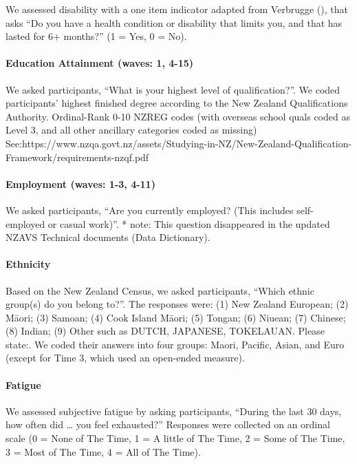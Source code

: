 \documentclass[
  single column]{article}
\let\oldparagraph\paragraph
\renewcommand{\paragraph}[1]{\oldparagraph{#1}\mbox{}}
\begin{document}
We assessed disability with a one item indicator adapted from Verbrugge
(), that asks ``Do you have a health
condition or disability that limits you, and that has lasted for 6+
months?'' (1 = Yes, 0 = No).

\paragraph{Education Attainment (waves: 1,
4-15)}\label{education-attainment-waves-1-4-15}

We asked participants, ``What is your highest level of qualification?''.
We coded participants' highest finished degree according to the New
Zealand Qualifications Authority. Ordinal-Rank 0-10 NZREG codes (with
overseas school quals coded as Level 3, and all other ancillary
categories coded as missing)
See:https://www.nzqa.govt.nz/assets/Studying-in-NZ/New-Zealand-Qualification-Framework/requirements-nzqf.pdf

\paragraph{Employment (waves: 1-3,
4-11)}\label{employment-waves-1-3-4-11}

We asked participants, ``Are you currently employed? (This includes
self-employed or casual work)''. * note: This question disappeared in
the updated NZAVS Technical documents (Data Dictionary).

\paragraph{Ethnicity}\label{ethnicity}

Based on the New Zealand Census, we asked participants, ``Which ethnic
group(s) do you belong to?''. The responses were: (1) New Zealand
European; (2) Māori; (3) Samoan; (4) Cook Island Māori; (5) Tongan; (6)
Niuean; (7) Chinese; (8) Indian; (9) Other such as DUTCH, JAPANESE,
TOKELAUAN. Please state:. We coded their answers into four groups:
Maori, Pacific, Asian, and Euro (except for Time 3, which used an
open-ended measure).

\paragraph{Fatigue}\label{fatigue}

We assessed subjective fatigue by asking participants, ``During the last
30 days, how often did \ldots{} you feel exhausted?'' Responses were
collected on an ordinal scale (0 = None of The Time, 1 = A little of The
Time, 2 = Some of The Time, 3 = Most of The Time, 4 = All of The Time).
\end{document}
